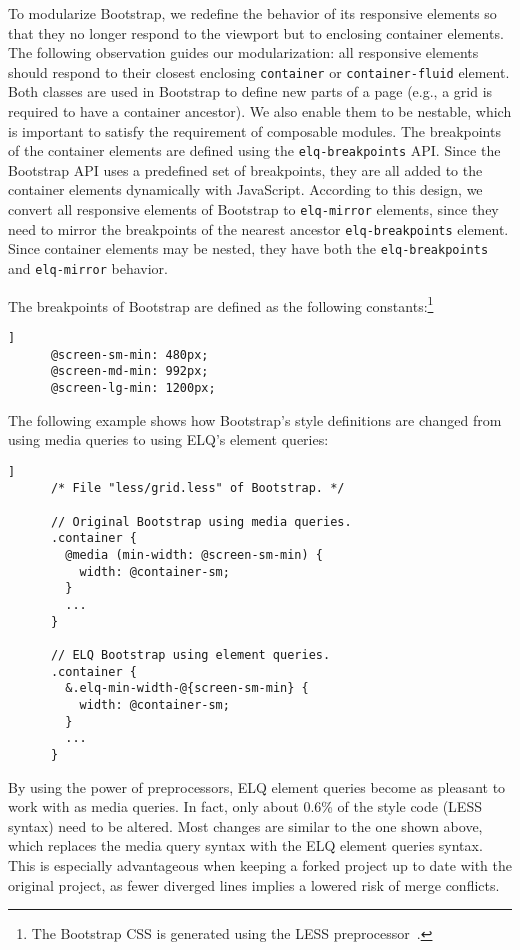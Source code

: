 \documentclass[]{llncs}
\newcommand{\code}[1]{\texttt{#1}}
\newcommand{\elq}{ELQ}
\begin{document}
    To modularize Bootstrap, we redefine the behavior of its responsive elements so that they no longer respond to the viewport but to enclosing container elements.
    The following observation guides our modularization: all responsive elements should respond to their closest enclosing \code{container} or \code{container-fluid} element.
    Both classes are used in Bootstrap to define new parts of a page (e.g., a grid is required to have a container ancestor).
    We also enable them to be nestable, which is important to satisfy the requirement of composable modules.
    The breakpoints of the container elements are defined using the \code{elq-breakpoints} API.
    Since the Bootstrap API uses a predefined set of breakpoints, they are all added to the container elements dynamically with JavaScript.
    According to this design, we convert all responsive elements of Bootstrap to \code{elq-mirror} elements, since they need to mirror the breakpoints of the nearest ancestor \code{elq-breakpoints} element.
    Since container elements may be nested, they have both the \code{elq-breakpoints} and \code{elq-mirror} behavior.

    The breakpoints of Bootstrap are defined as the following constants:\footnote{The Bootstrap CSS is generated using the LESS preprocessor~\cite{lesscss}.}
    \begin{lstlisting}[gobble=6,label={code:bootstrap-less-breakpoints},caption={},captionpos=b]]
      @screen-sm-min: 480px;
      @screen-md-min: 992px;
      @screen-lg-min: 1200px;
    \end{lstlisting}

    \noindent
    The following example shows how Bootstrap's style definitions are changed from using media queries to using \elq{}'s element queries:
    \begin{lstlisting}[gobble=6,label={code:bootstrap-less-breakpoints-usage},caption={},captionpos=b]]
      /* File "less/grid.less" of Bootstrap. */

      // Original Bootstrap using media queries.
      .container {
        @media (min-width: @screen-sm-min) {
          width: @container-sm;
        }
        ...
      }

      // ELQ Bootstrap using element queries.
      .container {
        &.elq-min-width-@{screen-sm-min} {
          width: @container-sm;
        }
        ...
      }
    \end{lstlisting}

    \noindent
    By using the power of preprocessors, \elq{} element queries become as pleasant to work with as media queries.
    In fact, only about 0.6\% of the style code (LESS syntax) need to be altered.
    Most changes are similar to the one shown above, which replaces the media query syntax with the \elq{} element queries syntax.
    This is especially advantageous when keeping a forked project up to date with the original project, as fewer diverged lines implies a lowered risk of merge conflicts.
\end{document}
